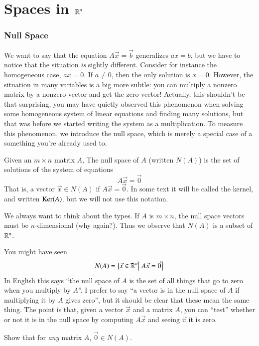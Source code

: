 \part{Spaces in $\mathbb{R}^n$}
\section{Null Space}

We want to say that the equation $A\vec{x}=\vec{b}$ generalizes $ax=b$, but we have to notice that the situation \emph{is} sightly different.  
Consider for instance the homogeneous case, $ax=0$.  If $a\ne 0$, then the only solution is $x=0$.
However, the situation in many variables is a big more subtle: you can multiply a nonzero matrix by a nonzero vector and get the zero vector!
Actually, this shouldn't be that surprising, you may have quietly observed this phenomenon when solving some homogeneous system of linear equations and finding many solutions, but that was before we started writing the system as a multiplication.  
To measure this phenomenon, we introduce the null space, which is merely a special case of a something you're already used to.
\begin{Def}
  Given an $m\times n$ matrix $A$, The null space of $A$ (written $N(A)$) is the set of solutions of the system of equations 
  \[A\vec{x}=\vec{0}\]
  That is, a vector $\vec{x}\in N(A)$ if $A\vec{x}=\vec{0}$.
  In some text it will be called the kernel, and written $\operatorname{Ker}\nolimits(A)$, but we will not use this notation.  
\end{Def}
\begin{Remark}
  We always want to think about the types.  If $A$ is $m\times n$, the null space vectors must be $n$-dimensional (why again?).  
  Thus we observe that $N(A)$ is a subset of $\mathbb{R}^n$.
\end{Remark}
\begin{Remark}
  You might have seen 
  \[N(A) = \left\{\vec{x}\in \mathbb{R}^n \right|\left. A\vec{x}=\vec{0} \right\}\]
  In English this says ``the null space of $A$ is the set of all things that go to zero when you multiply by $A$''.
  I prefer to say ``a vector is in the null space of $A$ if multiplying it by $A$ gives zero'', but it should be clear that these mean the same thing.
  The point is that, given a vector $\vec{x}$ and a matrix $A$, you can ``test'' whether or not it is in the null space by computing $A\vec{x}$ and seeing if it is zero.
\end{Remark}
\begin{EasyEx}
  Show that for \emph{any} matrix $A$, $\vec{0}\in N(A)$.  
\end{EasyEx}
